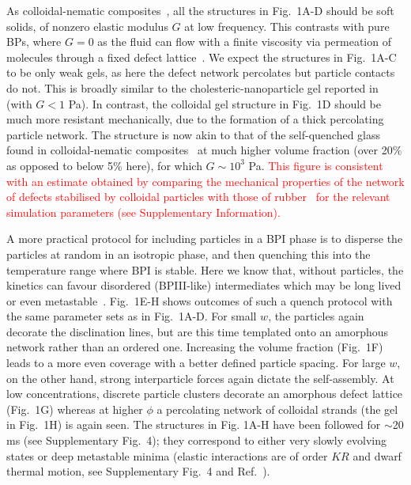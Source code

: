 \documentclass[12pt]{article}
\begin{document}
As colloidal-nematic composites~\cite{tiffany}, all the structures in
Fig.~1A-D 
should be soft solids, of nonzero elastic 
modulus $G$ at low frequency. This contrasts with pure BPs, where
$G=0$ as the fluid can flow with a finite
viscosity via permeation of molecules through a fixed defect lattice~\cite{permeation1,permeation2}. We expect the
structures in Fig.~1A-C to be only weak gels, as here the 
defect network percolates but particle contacts do not. This is broadly similar to the cholesteric-nanoparticle gel reported
in~\cite{lubensky} (with $G<1$ Pa). In contrast, the colloidal gel
structure in Fig.~1D should be much more resistant mechanically, 
due to the formation of a thick percolating particle network. The 
structure is now akin to that of the self-quenched glass found in 
colloidal-nematic composites~\cite{tiffany} at much higher volume 
fraction (over 20\% as opposed to below 5\% here), for which $G\sim 10^3$ Pa.
\textcolor{red}{
This figure is consistent with an estimate obtained by comparing
the mechanical properties of the network of defects stabilised by
colloidal particles with those of rubber~\cite{ramos} for
the relevant simulation parameters (see Supplementary Information).}


A more practical protocol for including particles in a BPI phase is to disperse the particles at random in an isotropic phase, and then quenching this into the temperature range where BPI is stable. Here we know that, without particles, the kinetics can favour disordered (BPIII-like) intermediates which may be long lived or even metastable~\cite{domaingrowth}. Fig.~1E-H shows outcomes of such a quench protocol with the same parameter sets as in Fig.~1A-D. For small $w$, the particles again decorate the disclination lines, but are this time templated onto an amorphous network rather than an ordered one.
Increasing the volume fraction (Fig.~1F) leads to a more even coverage with
a better defined particle spacing. 
For large $w$, on the other hand, strong interparticle forces again dictate
the self-assembly. At low concentrations, discrete particle clusters decorate an amorphous defect lattice (Fig.~1G) whereas at higher $\phi$ a percolating network of colloidal strands (the gel in Fig.~1H) is again seen. 
The structures in Fig. 1A-H have been followed for $\sim$20 ms 
(see Supplementary Fig.~4); they correspond to either very slowly evolving
states or  deep metastable minima (elastic interactions are of
order $KR$ and dwarf thermal motion, see
Supplementary Fig.~4 and Ref.~\cite{stark,lavrentovich}).
\end{document}
